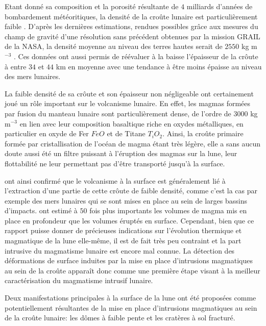 Etant donné sa composition et  la porosité résultante de $4$ milliards
d'années  de  bombardement  météoritiques,  la densité  de  la  croûte
lunaire  est particulièrement  faible \citep{Huang:2012gf,Han:2014ic}.
D'après les dernières estimations, rendues possibles grâce aux mesures
du champ  de gravité d'une  résolution sans précédent obtenues  par la
mission GRAIL  de la  NASA, la  densité moyenne  au niveau  des terres
hautes serait  de $2550$  kg m$^{-3}$  \citep{Wieczorek:2013ipa}.  Ces
données ont  aussi permis de réévaluer  à la baisse l'épaisseur  de la
crôute à  entre $34$ et  $44$ km en moyenne  avec une tendance  à être
moins épaisse au niveau des mers lunaires.

La faible  densité de sa crôute  et son épaisseur non  négligeable ont
certainement joué  un rôle  important sur  le volcanisme  lunaire.  En
effet,  les  magmas  formées  par   fusion  du  manteau  lunaire  sont
particulièrement   dense,   de   l'ordre   de   $3000$   kg   m$^{-3}$
\citep{Kiefer:2012kp} en  lien avec leur composition  basaltique riche
en oxydes  métalliques, en  particulier en  oxyde de  Fer $FeO$  et de
Titane $T_iO_2$. Ainsi, la  croûte primaire formée par cristallisation
de l'océan de  magma étant très légère, elle a  sans aucun doute aussi
été  un filtre  puissant à  l'éruption des  magmas sur  la lune,  leur
flottabilité  ne  leur permettant  pas  d'être  transporté jusqu'à  la
surface.

\citet{Wieczorek:2001jt}  ont ainsi  confirmé que  le volcanisme  à la
surface  est généralement  lié à  l'extraction d'une  partie de  cette
crôute de  faible densité,  comme c'est  la cas  par exemple  des mers
lunaires  qui  se sont  mises  en  place  au  sein de  larges  bassins
d'impacts. \citet{Head:1992bk} ont estimé  à $50$ fois plus importants
les  volumes de  magma  mis en  place en  profondeur  que les  volumes
éruptés en  surface. Cependant, bien  que ce rapport puisse  donner de
précieuses indications  sur l'évolution thermique et  magmatique de la
lune elle-même, il est de fait très peu contraint et la part intrusive
du  magmatisme  lunaire  est  encore mal  connue.   La  détection  des
déformations de  surface induites  par la  mise en  place d'intrusions
magmatiques  au sein  de la  croûte apparaît  donc comme  une première
étape  visant à  la  meilleur caractérisation  du magmatisme  intrusif
lunaire.

Deux  manifestations principales  à  la  surface de  la  lune ont  été
proposées  comme  potentiellement  résultantes  de la  mise  en  place
d'intrusions magmatiques  au sein  de la croûte  lunaire: les  dômes à
faible pente et les cratères à sol fracturé.

